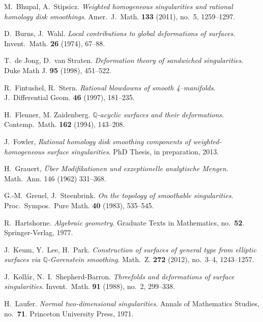 \documentclass[a4paper, reqno, twoside]{amsart}
\theoremstyle{definition}
\numberwithin{equation}{section}
\begin{document}
\begin{thebibliography}{99}
 M.~Bhupal, A.~Stipsicz. \textit{Weighted
    homogeneous singularities and rational homology disk
    smoothings}. Amer.~J.~Math. \textbf{133} (2011), no.~5, 1259--1297.

 D.~Burns, J.~Wahl. \textit{Local contributions to
    global deformations of surfaces}. Invent.~Math. \textbf{26} (1974),
  67--88.

 T.~de Jong, D.~van Straten. \textit{Deformation theory of sandwiched singularities}.  Duke Math J. \textbf{95} (1998),
  451--522.

 R.~Fintushel, R.~Stern. \textit{Rational
    blowdowns of smooth 4--manifolds}. J.~Differential Geom. \textbf{46}
  (1997), 181--235.

 H.~Flenner,
  M. Zaidenberg. \textit{$\mathbb{Q}$-acyclic surfaces and their
    deformations}. Contemp.~Math. \textbf{162} (1994), 143--208.

 J.~Fowler, \textit{Rational homology disk smoothing
    components of weighted-homogeneous surface singularities}. PhD Thesis, in
  preparation, 2013.

 H.~Grauert, \textit{{\"U}ber Modifikationen und exzeptionelle analytische Mengen}. Math.~Ann. 146 (1962) 331--368.

 G.-M.~Greuel, J.~Steenbrink. \textit{On the
    topology of smoothable singularities}. Proc.~Sympos.~Pure Math. \textbf{40} (1983), 535--545.

 R.~Hartshorne. \textit{Algebraic geometry}. Graduate Texts in Mathematics, no.~\textbf{52}. Springer-Verlag, 1977.

 J.~Keum, Y.~Lee, H.~Park. \textit{Construction of surfaces of general type from elliptic surfaces via $\mathbb{Q}$-Gorenstein smoothing}. Math.~Z. \textbf{272} (2012), no.~3--4, 1243--1257.

 J.~Koll\'ar, N.~I.~Shepherd-Barron. \textit{Threefolds and deformations of surface singularities}. Invent.~Math. \textbf{91} (1988), no.~2, 299--338.

 H.~Laufer. \textit{Normal two-dimensional singularities}. Annals of Mathematics Studies, no.~\textbf{71}. Princeton University Press, 1971.


\end{thebibliography}
\end{document}

